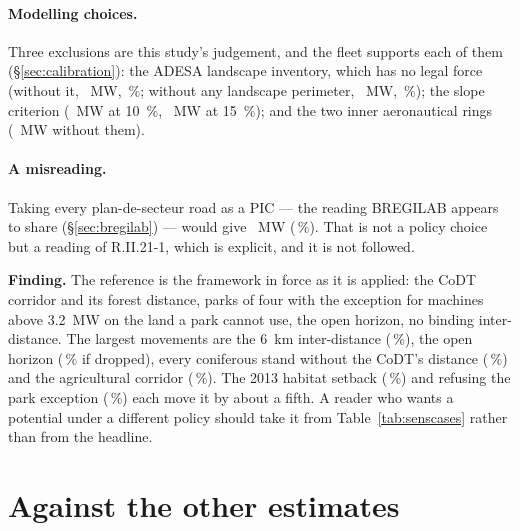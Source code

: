 \documentclass[11pt,a4paper]{article}
\newcommand{\finding}[1]{\par\medskip\noindent\colorbox{wal!10}{%
  \begin{minipage}{\dimexpr\linewidth-2\fboxsep}\textbf{Finding.} #1\end{minipage}}\par\medskip}
\begin{document}
\paragraph{Modelling choices.} Three exclusions are this study's judgement, and
the fleet supports each of them (§\ref{sec:calibration}): the ADESA landscape
inventory, which has no legal force (without it, \SensNoAdesaMW{}~MW,
\SensNoAdesaPct{}\,\%; without any landscape perimeter, \SensNoLandscapeMW{}~MW,
\SensNoLandscapePct{}\,\%); the slope criterion (\SensSlopeTenMW{}~MW at
\SI{10}{\percent}, \SensSlopeFifteenMW{}~MW at \SI{15}{\percent}); and the two
inner aeronautical rings (\SensNoAviationMW{}~MW without them).

\paragraph{A misreading.} Taking every plan-de-secteur road as a PIC --- the
reading BREGILAB appears to share (§\ref{sec:bregilab}) --- would give
\SensPicPdsMW{}~MW (\SensPicPdsPct{}\,\%). That is not a policy choice but a
reading of R.II.21-1, which is explicit, and it is not followed.

\finding{The reference is the framework in force as it is applied: the CoDT
corridor and its forest distance, parks of four with the exception for machines
above \SI{3.2}{\mega\watt} on the land a park cannot use, the open horizon, no
binding inter-distance. The largest movements are the 6~km inter-distance
(\SensIdSixPct{}\,\%), the open horizon (\SensNoHorizonPct{}\,\% if dropped),
every coniferous stand without the CoDT's distance (\SensForestConifPct{}\,\%)
and the agricultural corridor (\SensNoCorridorPct{}\,\%). The 2013 habitat
setback (\SensHabitatOldPct{}\,\%) and refusing the park exception
(\SensParksFourPct{}\,\%) each move it by about a fifth. A reader who
wants a potential under a different policy should take it from
Table~\ref{tab:senscases} rather than from the headline.}

\section{Against the other estimates}\label{sec:comparison}

\begin{table}[htbp]\centering\small
\caption{This study against the figures currently used or published. All
capacities are gross, i.e. they include the standing fleet.}
\label{tab:comparison}

\end{table}
\end{document}
